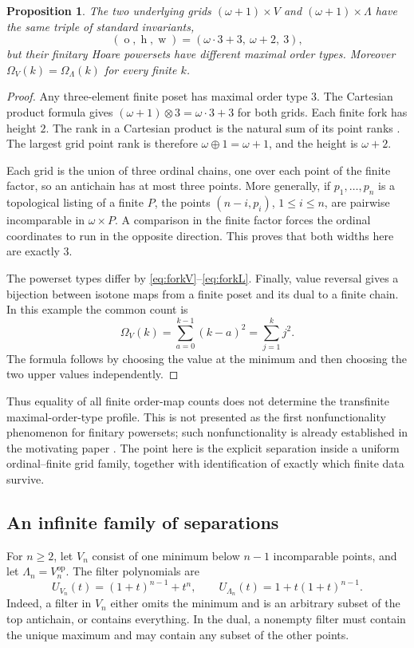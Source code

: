\documentclass[11pt,a4paper]{article}
\newtheorem{proposition}[proposition]{Proposition}
\theoremstyle{definition}
\theoremstyle{remark}
\newcommand{\otype}{\operatorname{o}}
\newcommand{\height}{\operatorname{h}}
\newcommand{\width}{\operatorname{w}}
\newcommand{\op}{\mathrm{op}}
\begin{document}
\begin{proposition}\label{prop:separation}
The two underlying grids $(\omega+1)\times V$ and
$(\omega+1)\times\Lambda$ have the same triple of standard invariants,
\[
 (\otype,\height,\width)=(\omega\cdot3+3,\ \omega+2,\ 3),
\]
but their finitary Hoare powersets have different maximal order types.
Moreover $\Omega_V(k)=\Omega_\Lambda(k)$ for every finite $k$.
\end{proposition}
\begin{proof}
Any three-element finite poset has maximal order type $3$. The Cartesian
product formula gives
$(\omega+1)\otimes3=\omega\cdot3+3$ for both grids. Each finite fork has
height $2$. The rank in a Cartesian product is the natural sum of its
point ranks \cite[Lemma~4.6]{DSS}. The largest grid point rank is therefore
$\omega\oplus1=\omega+1$, and the height is $\omega+2$.

Each grid is the union of three ordinal chains, one over each point of
the finite factor, so an antichain has at most three points. More
generally, if $p_1,\ldots,p_n$ is a topological listing of a finite $P$,
the points $(n-i,p_i)$, $1\leq i\leq n$, are pairwise incomparable in
$\omega\times P$. A comparison in the finite factor forces the ordinal
coordinates to run in the opposite direction. This proves that both
widths here are exactly $3$.

The powerset types differ by \eqref{eq:forkV}--\eqref{eq:forkL}. Finally,
value reversal gives a bijection between isotone maps from a finite poset
and its dual to a finite chain. In this example the common count is
\[
 \Omega_V(k)=\sum_{a=0}^{k-1}(k-a)^2
 =\sum_{j=1}^k j^2.
\]
The formula follows by choosing the value at the minimum and then choosing
the two upper values independently.
\end{proof}

Thus equality of all finite order-map counts does not determine the
transfinite maximal-order-type profile. This is not presented as the first
nonfunctionality phenomenon for finitary powersets; such nonfunctionality
is already established in the motivating paper \cite{AHLLSSV}. The point
here is the explicit separation inside a uniform ordinal--finite grid
family, together with identification of exactly which finite data survive.

\subsection{An infinite family of separations}
For $n\geq2$, let $V_n$ consist of one minimum below $n-1$ incomparable
points, and let $\Lambda_n=V_n^{\op}$. The filter polynomials are
\[
 U_{V_n}(t)=(1+t)^{n-1}+t^n,
 \qquad U_{\Lambda_n}(t)=1+t(1+t)^{n-1}.
\]
Indeed, a filter in $V_n$ either omits the minimum and is an arbitrary
subset of the top antichain, or contains everything. In the dual, a
nonempty filter must contain the unique maximum and may contain any
subset of the other points.
\end{document}
